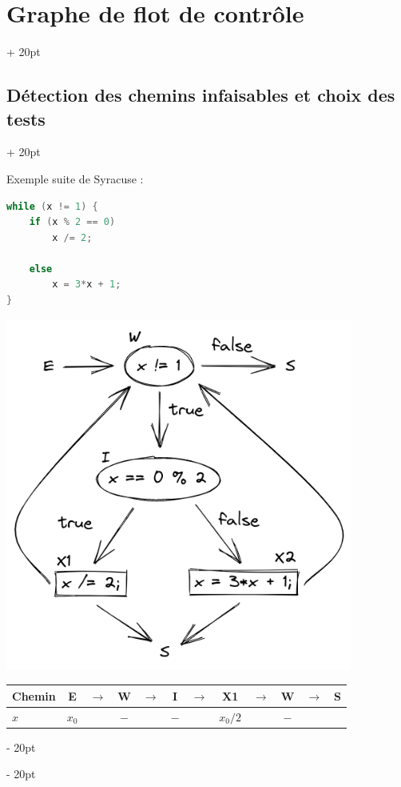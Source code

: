 \documentclass[a4paper, 12pt, twoside]{article}
\newcommand{\ind}[1][20pt]{\advance\leftskip + #1}
\newcommand{\deind}[1][20pt]{\advance\leftskip - #1}
\newenvironment{indentedenv}[1][20pt]{\par \ind[#1]}{\par \deind}
\newenvironment{indt}[2][20pt]{#2 \begin{indentedenv}[#1]}{\end{indentedenv}} %
\begin{document}
\begin{indt}{\section{Graphe de flot de contrôle}}
\begin{indt}{\subsection{Détection des chemins infaisables et choix des tests}}
            \vspace{12pt}
            
            Exemple \textendash{} suite de Syracuse :
            \begin{lstlisting}[language=C, xleftmargin=60pt]
while (x != 1) {
    if (x % 2 == 0)
        x /= 2;
    
    else
        x = 3*x + 1;
}\end{lstlisting}
            
            \begin{center}
                \includegraphics[scale=.4]{draw/draw5.png}
            \end{center}
            
            \vspace{6pt}
            
            \begin{tabular}{|p{50pt}|ccccccccccc|}
                \hline
                Chemin
                & E
                & $\rightarrow$
                & W
                & $\rightarrow$
                & I
                & $\rightarrow$
                & X1
                & $\rightarrow$
                & W
                & $\rightarrow$
                & S
                \\
                \hline
                $x$
                & $x_0$
                & \vline
                & $-$
                & \vline
                & $-$
                & \vline
                & $x_0 / 2$
                & \vline
                & $-$
                &&
                \\
                

\end{tabular}
\end{indt}
\end{indt}
\end{document}
